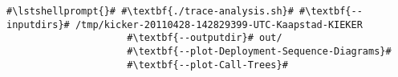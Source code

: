 \begin{lstlisting}[caption=Commands to produce the diagrams under \UnixLikeSystems,label=lst:traceAnalysis:sequenceDiagram]
#\lstshellprompt{}# #\textbf{./trace-analysis.sh}# #\textbf{--inputdirs}# /tmp/kicker-20110428-142829399-UTC-Kaapstad-KIEKER
                     #\textbf{--outputdir}# out/
                     #\textbf{--plot-Deployment-Sequence-Diagrams}#
                     #\textbf{--plot-Call-Trees}#							 
\end{lstlisting}
